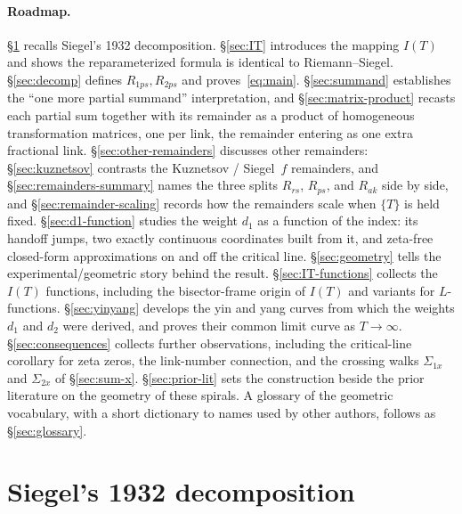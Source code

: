 \documentclass[11pt]{article}
\theoremstyle{definition}
\begin{document}
\paragraph{Roadmap.} \S\ref{sec:siegel} recalls Siegel's 1932 decomposition.
\S\ref{sec:IT} introduces the mapping $I(T)$ and shows the reparameterized
formula is identical to Riemann--Siegel. \S\ref{sec:decomp} defines
$R_{1ps},R_{2ps}$ and proves~\eqref{eq:main}. \S\ref{sec:summand} establishes the
``one more partial summand'' interpretation, and \S\ref{sec:matrix-product}
recasts each partial sum together with its remainder as a product of
homogeneous transformation matrices, one per link, the remainder entering as
one extra fractional link.
\S\ref{sec:other-remainders} discusses other remainders: \S\ref{sec:kuznetsov}
contrasts the Kuznetsov / Siegel~$f$ remainders, and
\S\ref{sec:remainders-summary} names the three splits $R_{rs}$, $R_{ps}$, and
$R_{ak}$ side by side, and \S\ref{sec:remainder-scaling} records how the
remainders scale when $\{T\}$ is held fixed.
\S\ref{sec:d1-function} studies the weight $d_1$ as a function of the index:
its handoff jumps, two exactly continuous coordinates built from it, and
zeta-free closed-form approximations on and off the critical line.
\S\ref{sec:geometry} tells the experimental/geometric story
behind the result. \S\ref{sec:IT-functions} collects the $I(T)$ functions,
including the bisector-frame origin of $I(T)$ and variants for
$L$-functions. \S\ref{sec:yinyang} develops the yin and yang
curves from which the weights $d_1$ and $d_2$ were derived, and proves
their common limit curve as $T\to\infty$.
\S\ref{sec:consequences} collects further observations, including the
critical-line corollary for zeta zeros, the link-number connection, and the
crossing walks \(\Sigma_{1x}\) and \(\Sigma_{2x}\) of \S\ref{sec:sum-x}.
\S\ref{sec:prior-lit} sets the construction beside the prior literature on the
geometry of these spirals.
A glossary of the geometric vocabulary, with a short dictionary to names
used by other authors, follows as \S\ref{sec:glossary}.

\section{Siegel's 1932 decomposition}\label{sec:siegel}
\end{document}
